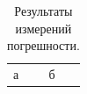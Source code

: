 \begin{table}
  \caption{Результаты измерений погрешности.} %
  \label{tab:results}
  \begin{tabular}{ll}
    а & б \\
  \end{tabular}
\end{table}
